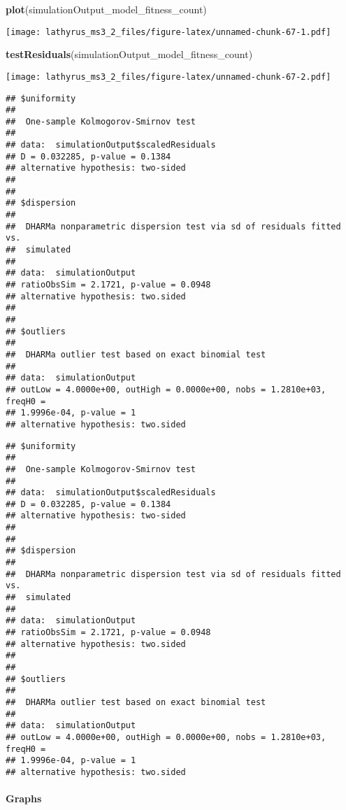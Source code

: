 \documentclass[
]{article}
\newenvironment{Shaded}{\begin{snugshade}}{\end{snugshade}}
\newcommand{\KeywordTok}[1]{\textcolor[rgb]{0.13,0.29,0.53}{\textbf{#1}}}
\newcommand{\NormalTok}[1]{#1}
\begin{document}
\begin{Shaded}
\begin{Highlighting}[]
\KeywordTok{plot}\NormalTok{(simulationOutput_model_fitness_count)}
\end{Highlighting}
\end{Shaded}

\texttt{[image: lathyrus\_ms3\_2\_files/figure-latex/unnamed-chunk-67-1.pdf]}

\begin{Shaded}
\begin{Highlighting}[]
\KeywordTok{testResiduals}\NormalTok{(simulationOutput_model_fitness_count)}
\end{Highlighting}
\end{Shaded}

\texttt{[image: lathyrus\_ms3\_2\_files/figure-latex/unnamed-chunk-67-2.pdf]}

\begin{verbatim}
## $uniformity
## 
##  One-sample Kolmogorov-Smirnov test
## 
## data:  simulationOutput$scaledResiduals
## D = 0.032285, p-value = 0.1384
## alternative hypothesis: two-sided
## 
## 
## $dispersion
## 
##  DHARMa nonparametric dispersion test via sd of residuals fitted vs.
##  simulated
## 
## data:  simulationOutput
## ratioObsSim = 2.1721, p-value = 0.0948
## alternative hypothesis: two.sided
## 
## 
## $outliers
## 
##  DHARMa outlier test based on exact binomial test
## 
## data:  simulationOutput
## outLow = 4.0000e+00, outHigh = 0.0000e+00, nobs = 1.2810e+03, freqH0 =
## 1.9996e-04, p-value = 1
## alternative hypothesis: two.sided
\end{verbatim}

\begin{verbatim}
## $uniformity
## 
##  One-sample Kolmogorov-Smirnov test
## 
## data:  simulationOutput$scaledResiduals
## D = 0.032285, p-value = 0.1384
## alternative hypothesis: two-sided
## 
## 
## $dispersion
## 
##  DHARMa nonparametric dispersion test via sd of residuals fitted vs.
##  simulated
## 
## data:  simulationOutput
## ratioObsSim = 2.1721, p-value = 0.0948
## alternative hypothesis: two.sided
## 
## 
## $outliers
## 
##  DHARMa outlier test based on exact binomial test
## 
## data:  simulationOutput
## outLow = 4.0000e+00, outHigh = 0.0000e+00, nobs = 1.2810e+03, freqH0 =
## 1.9996e-04, p-value = 1
## alternative hypothesis: two.sided
\end{verbatim}

\hypertarget{graphs-1}{%
\paragraph{Graphs}\label{graphs-1}}
\end{document}
